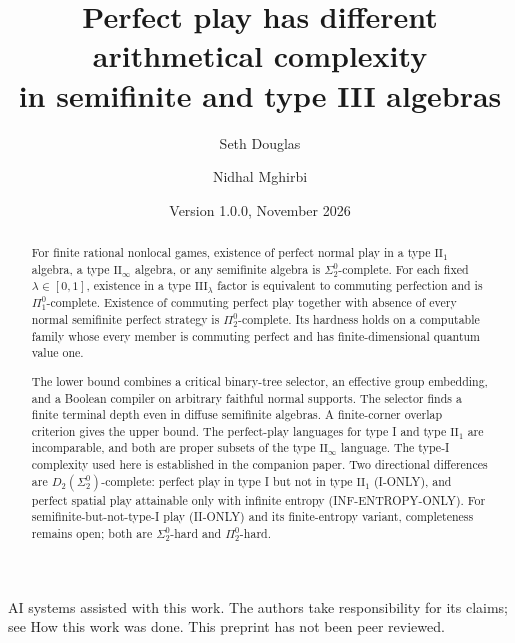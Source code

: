 \documentclass[11pt,a4paper]{article}
\title{Perfect play has different arithmetical complexity\\ in semifinite and type III algebras}
\author{Seth Douglas \and Nidhal Mghirbi}
\date{Version 1.0.0, November 2026}
\theoremstyle{remark}
\newcommand{\II}{\mathrm{II}}
\newcommand{\III}{\mathrm{III}}
\begin{document}
\maketitle
\begin{abstract}
For finite rational nonlocal games, existence of perfect normal play in a type
$\II_1$ algebra, a type $\II_\infty$ algebra, or any semifinite algebra is
$\Sigma^0_2$-complete. For each fixed $\lambda\in[0,1]$, existence in a type
$\III_\lambda$ factor is equivalent to commuting perfection and is
$\Pi^0_1$-complete. Existence of commuting perfect play together with absence
of every normal semifinite perfect strategy is $\Pi^0_2$-complete. Its
hardness holds on a computable family whose every member is commuting
perfect and has finite-dimensional quantum value one.

The lower bound combines a critical binary-tree selector, an effective group
embedding, and a Boolean compiler on arbitrary faithful normal supports.
The selector finds a finite terminal depth even in diffuse semifinite
algebras. A finite-corner overlap criterion gives the upper bound.
The perfect-play languages for type I and type $\II_1$ are incomparable,
and both are proper subsets of the type $\II_\infty$ language.
The type-I complexity used here is established in the companion paper.
Two directional differences are $D_2(\Sigma^0_2)$-complete: perfect play in type I but not in type $\II_1$ (I-ONLY), and perfect spatial play attainable only with infinite entropy (INF-ENTROPY-ONLY). For semifinite-but-not-type-I play
(II-ONLY) and its finite-entropy variant, completeness remains open;
both are $\Sigma^0_2$-hard and $\Pi^0_2$-hard.
\end{abstract}
\begin{center}\small AI systems assisted with this work. The authors take responsibility for its claims; see How this work was done. This preprint has not been peer reviewed.\end{center}
\clearpage
{\small\tableofcontents}
\clearpage










\appendix



\end{document}
